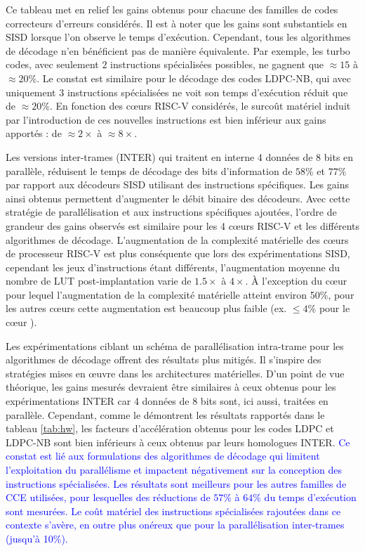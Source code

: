 \documentclass[../main.tex]{subfiles}
\begin{document}

Ce tableau met en relief les gains obtenus pour chacune des familles de codes correcteurs d'erreurs considérés. 
Il est à noter que les gains sont substantiels en SISD lorsque l'on observe le temps d'exécution. 
Cependant, tous les algorithmes de décodage n'en bénéficient pas de manière équivalente. 
Par exemple, les turbo codes, avec seulement $2$ instructions spécialisées possibles, ne gagnent que $\approx 15$ à $\approx 20\%$. 
Le constat est similaire pour le décodage des codes LDPC-NB, qui avec uniquement $3$ instructions spécialisées ne voit son temps d'exécution réduit que de $\approx 20\%$. 
En fonction des cœurs RISC-V considérés, le surcoût matériel induit par l'introduction de ces nouvelles instructions est bien inférieur aux gains apportés : de $\approx2\times$ à $\approx8\times$.

Les versions inter-trames (INTER) qui traitent en interne 4 données de 8 bits en parallèle, réduisent le temps de décodage des bits d'information de $58\%$ et $77\%$ par rapport aux décodeurs SISD utilisant des instructions spécifiques. 
Les gains ainsi obtenus permettent d'augmenter le débit binaire des décodeurs. 
Avec cette stratégie de parallélisation et aux instructions spécifiques ajoutées, l'ordre de grandeur des gains observés est similaire pour les 4 cœurs RISC-V et les différents algorithmes de décodage. 
L'augmentation de la complexité matérielle des cœurs de processeur RISC-V est plus conséquente que lors des expérimentations SISD, cependant les jeux d'instructions étant différents, l'augmentation moyenne du nombre de LUT post-implantation varie de $1.5\times$ à $4\times$. 
À l'exception du cœur \PicoRV\space pour lequel l'augmentation de la complexité matérielle atteint environ 50\%, pour les autres cœurs cette augmentation est beaucoup plus faible (ex. $\leq 4\%$ pour le cœur \RISCY).

Les expérimentations ciblant un schéma de parallélisation intra-trame pour les algorithmes de décodage offrent des résultats plus mitigés. 
Il s'inspire des stratégies mises en œuvre dans les architectures matérielles. 
D'un point de vue théorique, les gains mesurés devraient être similaires à ceux obtenus pour les expérimentations INTER car 4 données de 8 bits sont, ici aussi, traitées en parallèle.
Cependant, comme le démontrent les résultats rapportés dans le tableau \ref{tab:hw}, les facteurs d'accélération obtenus pour les codes LDPC et LDPC-NB sont bien inférieurs à ceux obtenus par leurs homologues INTER. 
\textcolor{blue}{Ce constat est lié aux formulations des algorithmes de décodage qui limitent l'exploitation du parallélisme et impactent négativement sur la conception des instructions spécialisées.
Les résultats sont meilleurs pour les autres familles de CCE utilisées, pour lesquelles des réductions de $57\%$ à $64\%$ du temps d'exécution sont mesurées. 
Le coût matériel des instructions spécialisées rajoutées dans ce contexte s'avère, en outre plus onéreux que pour la parallélisation inter-trames (jusqu'à 10\%).}
\end{document}

